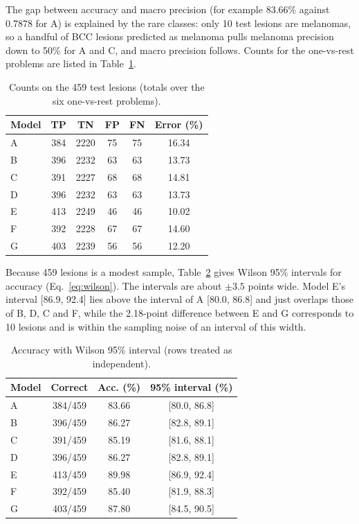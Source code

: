 \documentclass[conference]{IEEEtran}
\begin{document}
The gap between accuracy and macro precision (for example 83.66\% against 0.7878 for A) is explained by the rare classes: only 10 test lesions are melanomas, so a handful of BCC lesions predicted as melanoma pulls melanoma precision down to 50\% for A and C, and macro precision follows. Counts for the one-vs-rest problems are listed in Table~\ref{tab:counts}.

\begin{table}[!t]
\caption{Counts on the 459 test lesions (totals over the six one-vs-rest problems).}
\label{tab:counts}
\centering\scriptsize\setlength{\tabcolsep}{2.4pt}
\begin{tabular}{lccccc}
\toprule
Model & TP & TN & FP & FN & Error (\%) \\
\midrule
A & 384 & 2220 & 75 & 75 & 16.34 \\
B & 396 & 2232 & 63 & 63 & 13.73 \\
C & 391 & 2227 & 68 & 68 & 14.81 \\
D & 396 & 2232 & 63 & 63 & 13.73 \\
E & 413 & 2249 & 46 & 46 & 10.02 \\
F & 392 & 2228 & 67 & 67 & 14.60 \\
G & 403 & 2239 & 56 & 56 & 12.20 \\
\bottomrule
\end{tabular}
\end{table}


Because 459 lesions is a modest sample, Table~\ref{tab:ci} gives Wilson 95\% intervals for accuracy (Eq.~\eqref{eq:wilson}). The intervals are about $\pm3.5$ points wide. Model E's interval [86.9, 92.4] lies above the interval of A [80.0, 86.8] and just overlaps those of B, D, C and F, while the 2.18-point difference between E and G corresponds to 10 lesions and is within the sampling noise of an interval of this width.

\begin{table}[!t]
\caption{Accuracy with Wilson 95\% interval (rows treated as independent).}
\label{tab:ci}
\centering\scriptsize\setlength{\tabcolsep}{2.4pt}
\begin{tabular}{lccc}
\toprule
Model & Correct & Acc. (\%) & 95\% interval (\%) \\
\midrule
A & 384/459 & 83.66 & [80.0, 86.8] \\
B & 396/459 & 86.27 & [82.8, 89.1] \\
C & 391/459 & 85.19 & [81.6, 88.1] \\
D & 396/459 & 86.27 & [82.8, 89.1] \\
E & 413/459 & 89.98 & [86.9, 92.4] \\
F & 392/459 & 85.40 & [81.9, 88.3] \\
G & 403/459 & 87.80 & [84.5, 90.5] \\
\bottomrule
\end{tabular}
\end{table}
\end{document}
